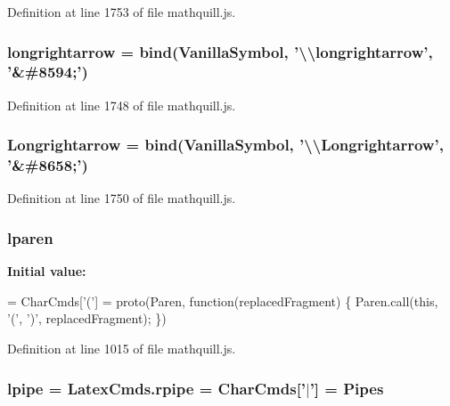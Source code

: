 Definition at line 1753 of file mathquill.\-js.

\subsubsection[{longrightarrow}]{ longrightarrow = {\bf bind}({\bf Vanilla\-Symbol}, '\textbackslash{}\textbackslash{}longrightarrow', '\&\#8594;')}\label{mathquill_8js_a1df2ba104ed9519633acd8fee4cc5358}


Definition at line 1748 of file mathquill.\-js.

\subsubsection[{Longrightarrow}]{ Longrightarrow = {\bf bind}({\bf Vanilla\-Symbol}, '\textbackslash{}\textbackslash{}Longrightarrow', '\&\#8658;')}\label{mathquill_8js_afd7a4cecf3faa2ace6ed330e5a5964d4}


Definition at line 1750 of file mathquill.\-js.

\subsubsection[{lparen}]{ lparen}\label{mathquill_8js_a3f05dde3bf37748b6c75292fa9306ed0}
{\bfseries Initial value\-:}
\begin{DoxyCode}
= CharCmds[\textcolor{charliteral}{'('}] = proto(Paren, \textcolor{keyword}{function}(replacedFragment) \{
  Paren.call(\textcolor{keyword}{this}, \textcolor{charliteral}{'('}, \textcolor{charliteral}{')'}, replacedFragment);
\})
\end{DoxyCode}


Definition at line 1015 of file mathquill.\-js.

\subsubsection[{lpipe}]{ lpipe = Latex\-Cmds.\-rpipe = {\bf Char\-Cmds}['$|$'] = {\bf Pipes}}\label{mathquill_8js_a1acb572934b7dbea811701f550cee936}


